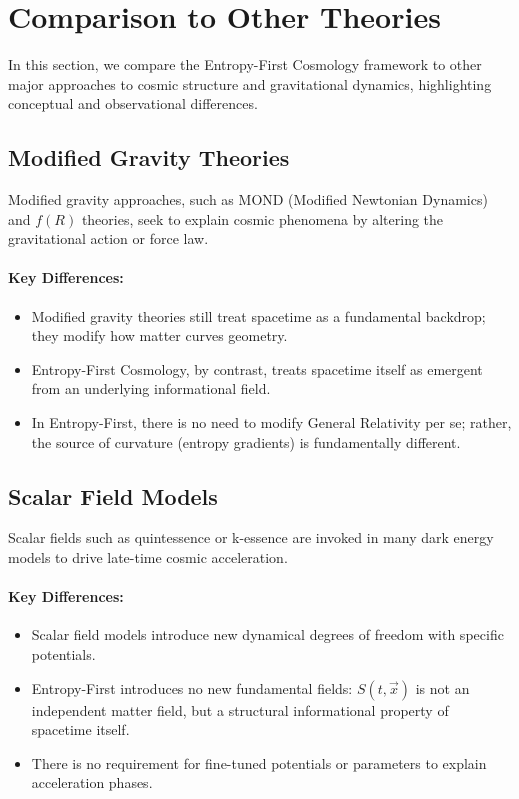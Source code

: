 \documentclass{article}
\begin{document}
\section{Comparison to Other Theories}

In this section, we compare the Entropy-First Cosmology framework to other major approaches to cosmic structure and gravitational dynamics, highlighting conceptual and observational differences.

\subsection{Modified Gravity Theories}

Modified gravity approaches, such as MOND (Modified Newtonian Dynamics) and $f(R)$ theories, seek to explain cosmic phenomena by altering the gravitational action or force law.

\paragraph{Key Differences:}
\begin{itemize}
    \item Modified gravity theories still treat spacetime as a fundamental backdrop; they modify how matter curves geometry.
    \item Entropy-First Cosmology, by contrast, treats spacetime itself as emergent from an underlying informational field.
    \item In Entropy-First, there is no need to modify General Relativity per se; rather, the source of curvature (entropy gradients) is fundamentally different.
\end{itemize}

\subsection{Scalar Field Models}

Scalar fields such as quintessence or k-essence are invoked in many dark energy models to drive late-time cosmic acceleration.

\paragraph{Key Differences:}
\begin{itemize}
    \item Scalar field models introduce new dynamical degrees of freedom with specific potentials.
    \item Entropy-First introduces no new fundamental fields: $S(t, \vec{x})$ is not an independent matter field, but a structural informational property of spacetime itself.
    \item There is no requirement for fine-tuned potentials or parameters to explain acceleration phases.
\end{itemize}
\end{document}

